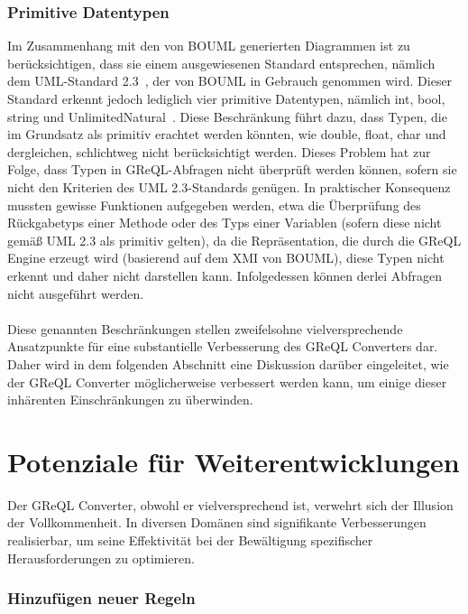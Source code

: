 \subsubsection{Primitive Datentypen}

Im Zusammenhang mit den von BOUML generierten Diagrammen ist zu berücksichtigen, dass sie einem ausgewiesenen Standard
entsprechen, nämlich dem UML-Standard 2.3~\cite{OMG_UML_23_Infrastructure}, der von BOUML in Gebrauch genommen wird.
Dieser Standard erkennt jedoch lediglich vier primitive Datentypen, nämlich int, bool, string und
UnlimitedNatural~\cite{OMG_UML_23_Infrastructure}. Diese Beschränkung führt dazu, dass Typen, die im Grundsatz als
primitiv erachtet werden könnten, wie double, float, char und dergleichen, schlichtweg nicht berücksichtigt werden.
Dieses Problem hat zur Folge, dass Typen in GReQL-Abfragen nicht überprüft werden können, sofern sie nicht den Kriterien
des UML 2.3-Standards genügen. In praktischer Konsequenz mussten gewisse Funktionen aufgegeben werden, etwa die
Überprüfung des Rückgabetyps einer Methode oder des Typs einer Variablen (sofern diese nicht gemäß UML 2.3 als primitiv
gelten), da die Repräsentation, die durch die GReQL Engine erzeugt wird (basierend auf dem XMI von BOUML), diese Typen
nicht erkennt und daher nicht darstellen kann. Infolgedessen können derlei Abfragen nicht ausgeführt werden.
\\~\\
Diese genannten Beschränkungen stellen zweifelsohne vielversprechende Ansatzpunkte für eine substantielle Verbesserung
des GReQL Converters dar. Daher wird in dem folgenden Abschnitt eine Diskussion darüber eingeleitet, wie der GReQL
Converter möglicherweise verbessert werden kann, um einige dieser inhärenten Einschränkungen zu überwinden.


\section{Potenziale für Weiterentwicklungen}

Der GReQL Converter, obwohl er vielversprechend ist, verwehrt sich der Illusion der Vollkommenheit. In diversen Domänen
sind signifikante Verbesserungen realisierbar, um seine Effektivität bei der Bewältigung spezifischer Herausforderungen
zu optimieren.

\subsubsection{Hinzufügen neuer Regeln}

